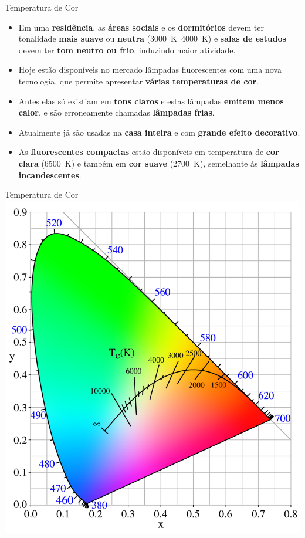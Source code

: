 \begin{frame}{Temperatura de Cor}
	\begin{block}{}
		\begin{itemize}
			\item Em uma \textbf{residência}, as \textbf{áreas sociais} e os \textbf{dormitórios} devem ter tonalidade \textbf{mais suave} ou \textbf{neutra} (\SI{3000}{\kelvin}~\SI{4000}{\kelvin}) e \textbf{salas de estudos} devem ter \textbf{tom neutro ou frio}, induzindo maior atividade.
			\item Hoje estão disponíveis no mercado lâmpadas fluorescentes com uma nova tecnologia, que permite apresentar \textbf{várias temperaturas de cor}.
			\item Antes elas só existiam em \textbf{tons claros} e estas lâmpadas \textbf{emitem menos calor}, e são erroneamente chamadas \textbf{lâmpadas frias}.
			\item Atualmente já são usadas na \textbf{casa inteira} e com \textbf{grande efeito decorativo}.
			\item As \textbf{fluorescentes compactas} estão disponíveis em temperatura de \textbf{cor clara} (\SI{6500}{\kelvin}) e também em \textbf{cor suave} (\SI{2700}{\kelvin}), semelhante às \textbf{lâmpadas incandescentes}.
		\end{itemize}
	\end{block}
\end{frame}


\begin{frame}{Temperatura de Cor}
	\centering
	\includegraphics[height=.9\textheight]{Figuras/Ch07/fig1}
\end{frame}


